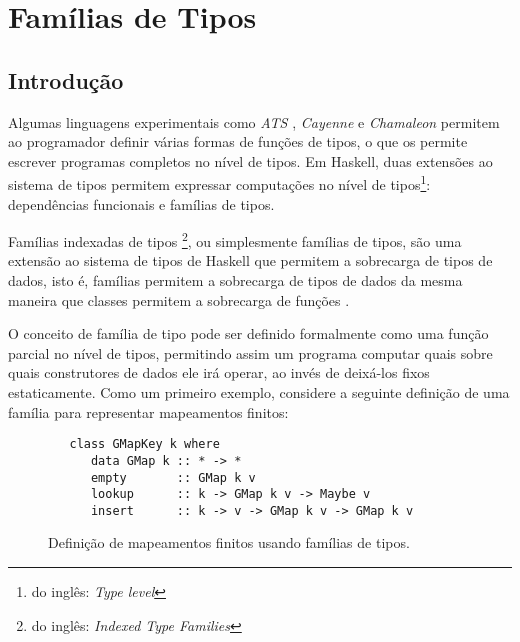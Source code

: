 \section{Fam\'ilias de Tipos}\label{typefam}

\subsection{Introdu\c{c}\~ao}

Algumas linguagens experimentais como \emph{ATS} \cite{Chen05}, \emph{Cayenne} \cite{Augustsson98} e \emph{Chamaleon}
\cite{Sulzmann06b} permitem ao programador definir v\'arias formas de fun\c{c}\~oes de tipos, o que os permite
escrever programas completos no n\'ivel de tipos. Em Haskell, duas extens\~oes ao sistema de tipos permitem expressar
computa\c{c}\~oes no n\'ivel de tipos\footnote{do ingl\^es: \emph{Type level}}: depend\^encias funcionais e fam\'ilias
de tipos.

Fam\'ilias indexadas de tipos \footnote{do ingl\^es: \emph{Indexed Type Families}}, ou simplesmente fam\'ilias de tipos,
s\~ao uma extens\~ao ao sistema de tipos de Haskell que permitem a sobrecarga de tipos de dados, isto \'e, fam\'ilias 
permitem a sobrecarga de tipos de dados da mesma maneira que classes permitem a sobrecarga de fun\c{c}\~oes 
\cite{Chakravarty05,Chakravarty05a}.

O conceito de fam\'ilia de tipo pode ser definido formalmente como uma fun\c{c}\~ao parcial no n\'ivel de 
tipos, permitindo assim um programa computar quais sobre quais construtores de
dados ele ir\'a operar, ao inv\'es de deix\'a-los fixos estaticamente. Como um primeiro exemplo, considere a seguinte 
defini\c{c}\~ao de uma fam\'ilia para representar mapeamentos finitos:
\begin{figure}[h]
	\begin{verbatim}
   class GMapKey k where
      data GMap k :: * -> *
      empty       :: GMap k v
      lookup      :: k -> GMap k v -> Maybe v
      insert      :: k -> v -> GMap k v -> GMap k v
	\end{verbatim}
	\centering
	\caption{Defini\c{c}\~ao de mapeamentos finitos usando fam\'ilias de tipos.}
	\label{fammapex}
\end{figure}


